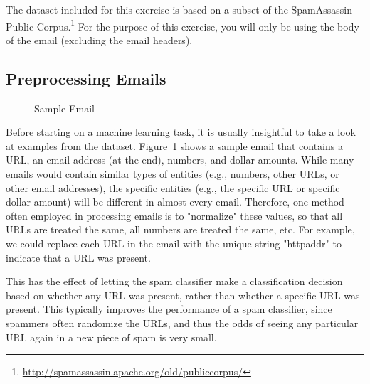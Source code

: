 \documentclass[12pt]{article}
\begin{document}
The dataset included for this exercise is based on a subset of the SpamAssassin Public Corpus.\footnote{\href{http://spamassassin.apache.org/old/publiccorpus/}{http://spamassassin.apache.org/old/publiccorpus/}} For the purpose of this exercise, you will only be using the body of the email (excluding the email headers).

\subsection{Preprocessing Emails}

\begin{figure}[h!]
  
  \caption{Sample Email}
  \label{block:sample}
  \end{figure}


Before starting on a machine learning task, it is usually insightful to take a look at examples from the dataset. Figure~\ref{block:sample} shows a sample email that contains a URL, an email address (at the end), numbers, and dollar amounts. While many emails would contain similar types of entities (e.g., numbers, other URLs, or other email addresses), the specific entities (e.g., the specific URL or specific dollar amount) will be different in almost every email. Therefore, one method often employed in processing emails is to  "normalize" these values, so that all URLs are treated the same, all numbers are treated the same, etc. For example, we could replace each URL in the email with the unique string "httpaddr" to indicate that a URL was present.

This has the effect of letting the spam classifier make a classification decision based on whether any URL was present, rather than whether a specific URL was present. This typically improves the performance of a spam classifier, since spammers often randomize the URLs, and thus the odds of seeing any particular URL again in a new piece of spam is very small.
\end{document}
